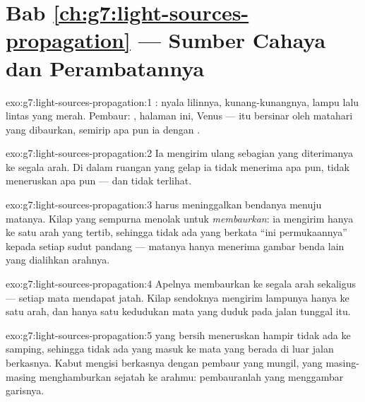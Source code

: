 \section*{Bab \ref{ch:g7:light-sources-propagation} --- Sumber Cahaya dan Perambatannya}

\begin{solution}{exo:g7:light-sources-propagation:1}
: nyala lilinnya, kunang-kunangnya, lampu lalu lintas
yang merah. Pembaur: , halaman ini, Venus ---  itu bersinar
oleh  matahari yang dibaurkan, semirip apa pun ia dengan .
\end{solution}

\begin{solution}{exo:g7:light-sources-propagation:2}
Ia mengirim ulang sebagian  yang diterimanya ke segala arah. Di
dalam ruangan yang gelap ia tidak menerima apa pun, tidak meneruskan
apa pun --- dan tidak terlihat.
\end{solution}

\begin{solution}{exo:g7:light-sources-propagation:3}
 harus meninggalkan bendanya menuju matanya. Kilap yang
sempurna menolak untuk \emph{membaurkan}: ia mengirim  hanya
ke satu arah yang tertib, sehingga tidak ada  yang berkata ``ini
permukaannya'' kepada setiap sudut pandang --- matanya hanya menerima
gambar benda lain yang dialihkan arahnya.
\end{solution}

\begin{solution}{exo:g7:light-sources-propagation:4}
Apelnya membaurkan ke segala arah sekaligus --- setiap mata mendapat
jatah. Kilap sendoknya mengirim  lampunya hanya ke satu arah,
dan hanya satu kedudukan mata yang duduk pada jalan tunggal itu.
\end{solution}

\begin{solution}{exo:g7:light-sources-propagation:5}
 yang bersih meneruskan hampir tidak ada ke samping, sehingga
tidak ada   yang masuk ke mata yang berada di luar jalan
berkasnya. Kabut mengisi berkasnya dengan pembaur yang mungil, yang
masing-masing menghamburkan sejatah ke arahmu: pembauranlah yang
menggambar garisnya.
\end{solution}

